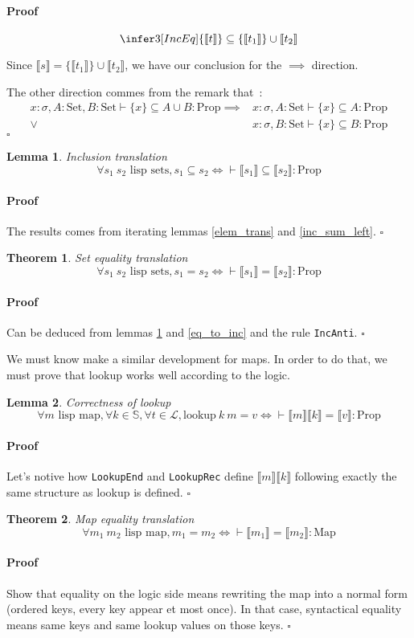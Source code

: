 \documentclass[]{article}
\newcommand{\sem}[1]{\llbracket #1 \rrbracket}
\renewcommand{\L}{\mathscr{L}}
\newcommand{\1}{\mathbbm{1}}
\newcommand{\0}{\mathbbm{0}}
\renewcommand{\S}{\mathbb{S}}
\newtheorem{theo}{Theorem}
\newtheorem{lem}{Lemma}
\newenvironment{prf}{\paragraph{Proof}}{\hfill$\square$}
\newcommand{\Prop}{\text{Prop}}
\newcommand{\Map}{\text{Map}}
\newcommand{\Set}{\text{Set}}
\renewcommand{\subset}{\subseteq}
\begin{document}
\begin{prf}
\[{        \infer3[IncEq]
               {\{\sem{t}\}\subset\{\sem{t_1}\}\cup\sem{t_2}}
    }\]

    Since $\sem{s} = \{\sem{t_1}\}\cup\sem{t_2}$, we have our conclusion for the
    $\implies$ direction.

    The other direction commes from the remark that~:
    \begin{align*}
        x:\sigma,A:\Set,B:\Set\vdash \{x\}\subset A\cup B:\Prop
        \implies &x:\sigma,A:\Set\vdash \{x\}\subset A:\Prop \\
          \vee\  &x:\sigma,B:\Set\vdash \{x\}\subset B:\Prop
    \end{align*}
\end{prf}

\begin{lem}{Inclusion translation}\label{inc_trans}
    \[\forall s_1\ s_2\text{ lisp sets}, s_1\subset s_2\iff
    \vdash \sem{s_1}\subset\sem{s_2}:\Prop\]
\end{lem}
\begin{prf}
    The results comes from iterating lemmas \ref{elem_trans} and \ref{inc_sum_left}.
\end{prf}

\begin{theo}{Set equality translation}\label{set_eq_trans}
    \[\forall s_1\ s_2\text{ lisp sets}, s_1= s_2\iff
    \vdash \sem{s_1}=\sem{s_2}:\Prop\]
\end{theo}
\begin{prf}
    Can be deduced from lemmas \ref{inc_trans} and \ref{eq_to_inc} and the rule
    \texttt{IncAnti}.
\end{prf}

We must know make a similar development for maps. In order to do that, we must prove
that lookup works well according to the logic.

\begin{lem}{Correctness of lookup}\label{lookup_correct}
    \[\forall m\text{ lisp map}, \forall k\in\S, \forall t\in\L,
    \text{lookup}\ k\ m = v \iff \vdash \sem{m}\sem{k} = \sem{v}:\Prop \]
\end{lem}
\begin{prf}
    Let's notive how \texttt{LookupEnd} and \texttt{LookupRec} define
    $\sem{m}\sem{k}$ following exactly the same structure as lookup is defined.
\end{prf}

\begin{theo}{Map equality translation}\label{map_eq_trans}
    \[\forall m_1\ m_2\text{ lisp map},
    m_1 = m_2 \iff \vdash \sem{m_1} = \sem{m_2}: \Map\]
\end{theo}
\begin{prf}
    Show that equality on the logic side means rewriting the map into a normal
    form (ordered keys, every key appear et most once). In that case, syntactical
    equality means same keys and same lookup values on those keys.
\end{prf}
\end{document}
